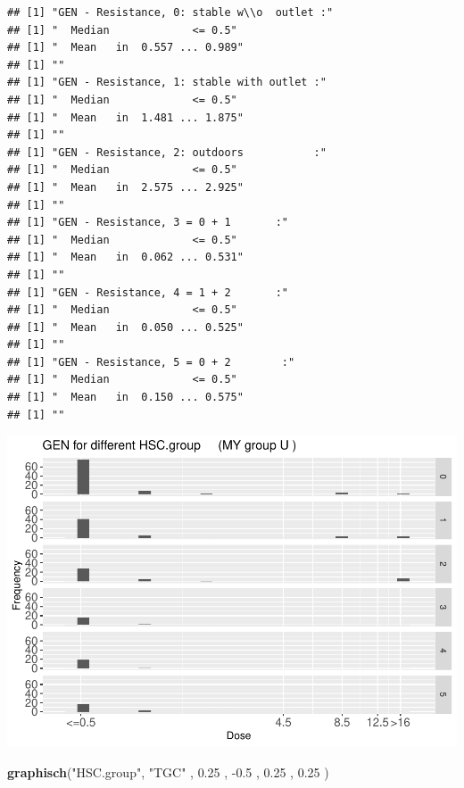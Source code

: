 \documentclass[
]{article}
\newenvironment{Shaded}{\begin{snugshade}}{\end{snugshade}}
\newcommand{\FloatTok}[1]{\textcolor[rgb]{0.00,0.00,0.81}{#1}}
\newcommand{\KeywordTok}[1]{\textcolor[rgb]{0.13,0.29,0.53}{\textbf{#1}}}
\newcommand{\NormalTok}[1]{#1}
\newcommand{\StringTok}[1]{\textcolor[rgb]{0.31,0.60,0.02}{#1}}
\begin{document}
\begin{verbatim}
## [1] "GEN - Resistance, 0: stable w\\o  outlet :"
## [1] "  Median             <= 0.5"
## [1] "  Mean   in  0.557 ... 0.989"
## [1] ""
## [1] "GEN - Resistance, 1: stable with outlet :"
## [1] "  Median             <= 0.5"
## [1] "  Mean   in  1.481 ... 1.875"
## [1] ""
## [1] "GEN - Resistance, 2: outdoors           :"
## [1] "  Median             <= 0.5"
## [1] "  Mean   in  2.575 ... 2.925"
## [1] ""
## [1] "GEN - Resistance, 3 = 0 + 1       :"
## [1] "  Median             <= 0.5"
## [1] "  Mean   in  0.062 ... 0.531"
## [1] ""
## [1] "GEN - Resistance, 4 = 1 + 2       :"
## [1] "  Median             <= 0.5"
## [1] "  Mean   in  0.050 ... 0.525"
## [1] ""
## [1] "GEN - Resistance, 5 = 0 + 2        :"
## [1] "  Median             <= 0.5"
## [1] "  Mean   in  0.150 ... 0.575"
## [1] ""
\end{verbatim}

\includegraphics{Verteilungen_files/figure-latex/unnamed-chunk-48-1.pdf}

\begin{Shaded}
\begin{Highlighting}[]
   \KeywordTok{graphisch}\NormalTok{(}\StringTok{"HSC.group"}\NormalTok{, }\StringTok{"TGC"}\NormalTok{ , }\FloatTok{0.25}\NormalTok{ ,  }\FloatTok{-0.5}\NormalTok{ ,   }\FloatTok{0.25}\NormalTok{ ,   }\FloatTok{0.25}\NormalTok{ )  }
\end{Highlighting}
\end{Shaded}
\end{document}
